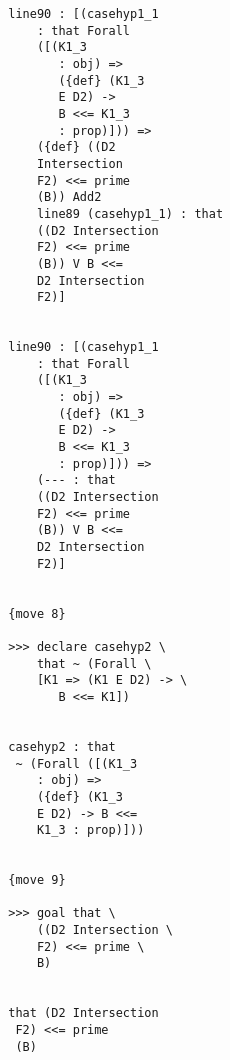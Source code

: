 \documentclass[12pt]{article}
\begin{document}
\begin{verbatim}
                           line90 : [(casehyp1_1 
                               : that Forall 
                               ([(K1_3 
                                  : obj) => 
                                  ({def} (K1_3 
                                  E D2) -> 
                                  B <<= K1_3 
                                  : prop)])) => 
                               ({def} ((D2 
                               Intersection 
                               F2) <<= prime 
                               (B)) Add2 
                               line89 (casehyp1_1) : that 
                               ((D2 Intersection 
                               F2) <<= prime 
                               (B)) V B <<= 
                               D2 Intersection 
                               F2)]


                           line90 : [(casehyp1_1 
                               : that Forall 
                               ([(K1_3 
                                  : obj) => 
                                  ({def} (K1_3 
                                  E D2) -> 
                                  B <<= K1_3 
                                  : prop)])) => 
                               (--- : that 
                               ((D2 Intersection 
                               F2) <<= prime 
                               (B)) V B <<= 
                               D2 Intersection 
                               F2)]


                           {move 8}

                           >>> declare casehyp2 \
                               that ~ (Forall \
                               [K1 => (K1 E D2) -> \
                                  B <<= K1])


                           casehyp2 : that 
                            ~ (Forall ([(K1_3 
                               : obj) => 
                               ({def} (K1_3 
                               E D2) -> B <<= 
                               K1_3 : prop)]))


                           {move 9}

                           >>> goal that \
                               ((D2 Intersection \
                               F2) <<= prime \
                               B)


                           that (D2 Intersection 
                            F2) <<= prime 
                            (B)



\end{verbatim}
\end{document}
